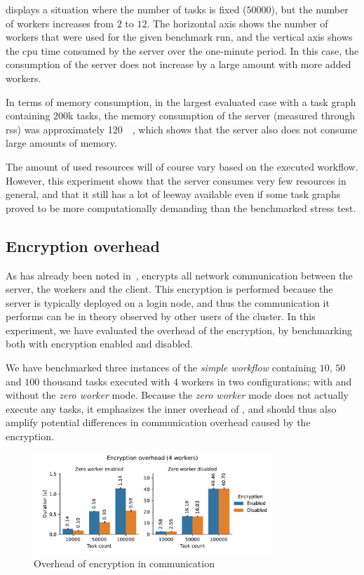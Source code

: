  displays a situation where the number of tasks
is fixed ($50000$), but the number of workers increases from $2$
to $12$. The horizontal axis shows the number of workers that were used for the
given benchmark run, and the vertical axis shows the \gls{cpu} time consumed by the
server over the one-minute period. In this case, the consumption of the server does not increase by
a large amount with more added workers.

In terms of memory consumption, in the largest evaluated case with a task graph containing
$200$k tasks, the memory consumption of the server (measured through
\gls{rss}) was approximately \SI{120}{\mebi\byte}, which shows that the server
also does not consume large amounts of memory.

The amount of used resources will of course vary based on the executed workflow. However, this
experiment shows that the server consumes very few resources in general, and that it still has a
lot of leeway available even if some task graphs proved to be more computationally demanding than
the benchmarked stress test.

\subsection{Encryption overhead}
\label{sec:hq-exp-encryption-overhead}
As has already been noted in~, \hyperqueue{} encrypts all network
communication between the server, the workers and the client. This encryption is performed because
the server is typically deployed on a login node, and thus the communication it performs can be in
theory observed by other users of the cluster. In this experiment, we have evaluated the overhead
of the encryption, by benchmarking \hyperqueue{} both with encryption enabled and
disabled.

We have benchmarked three instances of the \emph{simple workflow} containing
$10$, $50$ and $100$ thousand tasks executed
with $4$ \hyperqueue{} workers in two configurations; with and without
the \emph{zero worker} mode. Because the \emph{zero worker} mode does not actually
execute any tasks, it emphasizes the inner overhead of \hyperqueue{}, and should thus
also amplify potential differences in communication overhead caused by the encryption.

\begin{figure}[h]
	\centering
	\includegraphics[width=0.8\textwidth]{imgs/hq/charts/encryption-overhead}
	\caption{Overhead of encryption in \hyperqueue{} communication}
	\label{fig:hq-encryption-overhead}
\end{figure}

